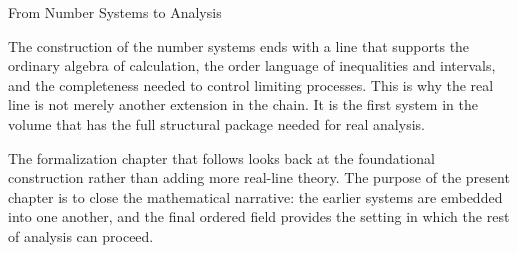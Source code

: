 \label{sec:real-line-from-number-systems-to-analysis}

\begin{topicbox}{From Number Systems to Analysis}
\begin{exposition}
The construction of the number systems ends with a line that supports the
ordinary algebra of calculation, the order language of inequalities and
intervals, and the completeness needed to control limiting processes. This is
why the real line is not merely another extension in the chain. It is the
first system in the volume that has the full structural package needed for
real analysis.
\end{exposition}

\begin{exposition}
The formalization chapter that follows looks back at the foundational
construction rather than adding more real-line theory. The purpose of the
present chapter is to close the mathematical narrative: the earlier systems
are embedded into one another, and the final ordered field provides the
setting in which the rest of analysis can proceed.
\end{exposition}
\end{topicbox}

